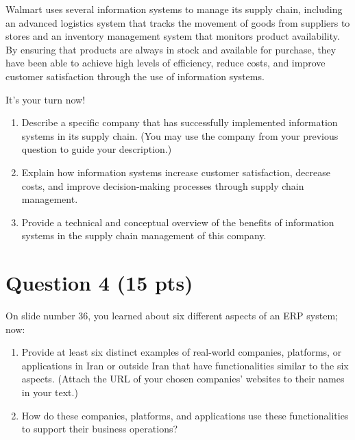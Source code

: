 \begin{question}
	Walmart uses several information systems to manage its supply chain, including an advanced logistics system that tracks the movement of goods from suppliers to stores and an inventory management system that monitors product availability. By ensuring that products are always in stock and available for purchase, they have been able to achieve high levels of efficiency, reduce costs, and improve customer satisfaction through the use of information systems.
	
	It's your turn now!
	\begin{enumerate}
		\item Describe a specific company that has successfully implemented information systems in its supply chain. (You may use the company from your previous question to guide your description.)
		\item Explain how information systems increase customer satisfaction, decrease costs, and improve decision-making processes through supply chain management.
		\item Provide a technical and conceptual overview of the benefits of information systems in the supply chain management of this company.
	\end{enumerate}
	
\end{question}

\pagebreak
\begin{answer}
	
\end{answer}

\pagebreak
\section{Question 4 \normalsize(15 pts)}

\begin{question}
	On slide number 36, you learned about six different aspects of an ERP system; now:
	\begin{enumerate}
		\item Provide at least six distinct examples of real-world companies, platforms, or applications in Iran or outside Iran that have functionalities similar to the six aspects. (Attach the URL of your chosen companies' websites to their names in your text.)
		\item How do these companies, platforms, and applications use these functionalities to support their business operations?
	\end{enumerate}
\end{question}

